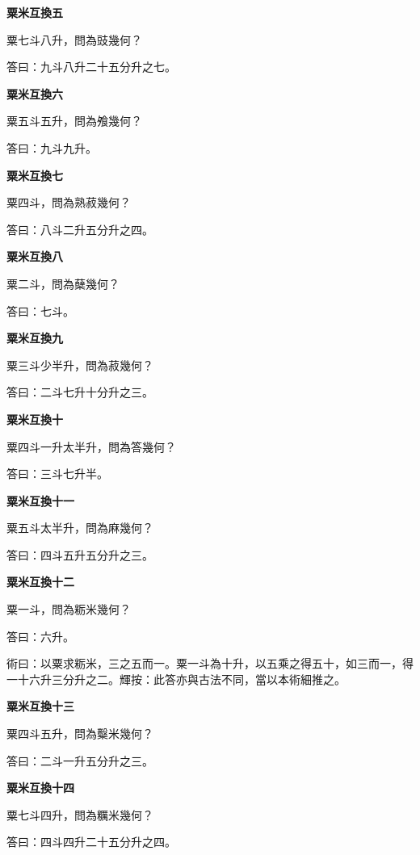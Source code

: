 \documentclass[11pt,a4paper]{article}
\newenvironment{problemenv}[1]{%
  \medskip\noindent\textbf{#1}\par\nopagebreak\smallskip
}{\medskip}
\begin{document}
\begin{problemenv}{粟米互換五}
粟七斗八升，問為豉幾何？

\textsf{答曰：}九斗八升二十五分升之七。
\end{problemenv}

\begin{problemenv}{粟米互換六}
粟五斗五升，問為飧幾何？

\textsf{答曰：}九斗九升。
\end{problemenv}

\begin{problemenv}{粟米互換七}
粟四斗，問為熟菽幾何？

\textsf{答曰：}八斗二升五分升之四。
\end{problemenv}

\begin{problemenv}{粟米互換八}
粟二斗，問為蘖幾何？

\textsf{答曰：}七斗。
\end{problemenv}

\begin{problemenv}{粟米互換九}
粟三斗少半升，問為菽幾何？

\textsf{答曰：}二斗七升十分升之三。
\end{problemenv}

\begin{problemenv}{粟米互換十}
粟四斗一升太半升，問為答幾何？

\textsf{答曰：}三斗七升半。
\end{problemenv}

\begin{problemenv}{粟米互換十一}
粟五斗太半升，問為麻幾何？

\textsf{答曰：}四斗五升五分升之三。
\end{problemenv}

\begin{problemenv}{粟米互換十二}
粟一斗，問為粝米幾何？

\textsf{答曰：}六升。

\textsf{術曰：}以粟求粝米，三之五而一。粟一斗為十升，以五乘之得五十，如三而一，得一十六升三分升之二。輝按：此答亦與古法不同，當以本術細推之。
\end{problemenv}

\begin{problemenv}{粟米互換十三}
粟四斗五升，問為糳米幾何？

\textsf{答曰：}二斗一升五分升之三。
\end{problemenv}

\begin{problemenv}{粟米互換十四}
粟七斗四升，問為糲米幾何？

\textsf{答曰：}四斗四升二十五分升之四。
\end{problemenv}
\end{document}
